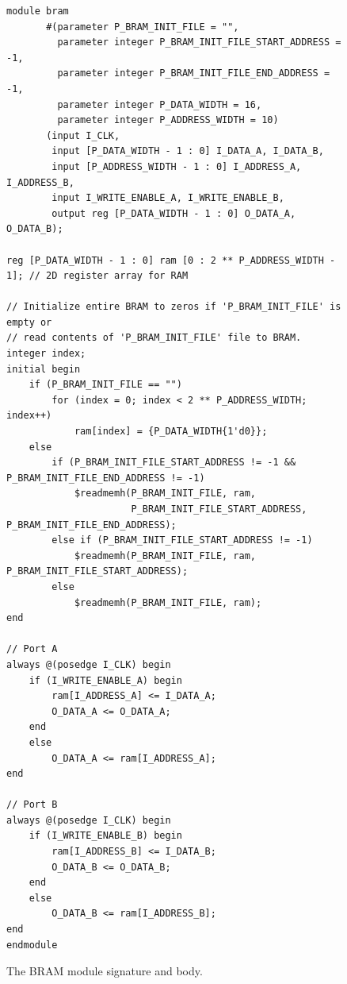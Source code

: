 \documentclass[conference]{IEEEtran}
\begin{document}
\begin{figure}
    \begin{lstlisting}[style={verilog-style}]
module bram
       #(parameter P_BRAM_INIT_FILE = "",
         parameter integer P_BRAM_INIT_FILE_START_ADDRESS = -1,
         parameter integer P_BRAM_INIT_FILE_END_ADDRESS = -1,
         parameter integer P_DATA_WIDTH = 16,
         parameter integer P_ADDRESS_WIDTH = 10)
       (input I_CLK,
        input [P_DATA_WIDTH - 1 : 0] I_DATA_A, I_DATA_B,
        input [P_ADDRESS_WIDTH - 1 : 0] I_ADDRESS_A, I_ADDRESS_B,
        input I_WRITE_ENABLE_A, I_WRITE_ENABLE_B,
        output reg [P_DATA_WIDTH - 1 : 0] O_DATA_A, O_DATA_B);

reg [P_DATA_WIDTH - 1 : 0] ram [0 : 2 ** P_ADDRESS_WIDTH - 1]; // 2D register array for RAM

// Initialize entire BRAM to zeros if 'P_BRAM_INIT_FILE' is empty or
// read contents of 'P_BRAM_INIT_FILE' file to BRAM.
integer index;
initial begin
    if (P_BRAM_INIT_FILE == "")
        for (index = 0; index < 2 ** P_ADDRESS_WIDTH; index++)
            ram[index] = {P_DATA_WIDTH{1'd0}};
    else
        if (P_BRAM_INIT_FILE_START_ADDRESS != -1 && P_BRAM_INIT_FILE_END_ADDRESS != -1)
            $readmemh(P_BRAM_INIT_FILE, ram,
                      P_BRAM_INIT_FILE_START_ADDRESS, P_BRAM_INIT_FILE_END_ADDRESS);
        else if (P_BRAM_INIT_FILE_START_ADDRESS != -1)
            $readmemh(P_BRAM_INIT_FILE, ram, P_BRAM_INIT_FILE_START_ADDRESS);
        else
            $readmemh(P_BRAM_INIT_FILE, ram);
end

// Port A
always @(posedge I_CLK) begin
    if (I_WRITE_ENABLE_A) begin
        ram[I_ADDRESS_A] <= I_DATA_A;
        O_DATA_A <= O_DATA_A;
    end
    else
        O_DATA_A <= ram[I_ADDRESS_A];
end

// Port B
always @(posedge I_CLK) begin
    if (I_WRITE_ENABLE_B) begin
        ram[I_ADDRESS_B] <= I_DATA_B;
        O_DATA_B <= O_DATA_B;
    end
    else
        O_DATA_B <= ram[I_ADDRESS_B];
end
endmodule
    \end{lstlisting}
    \caption{The BRAM module signature and body.}
    \label{figure:bram_module}
\end{figure}
\end{document}
